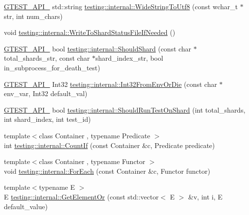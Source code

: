 \begin{DoxyCompactItemize}
\item 
\hyperlink{gtest-port_8h_aa73be6f0ba4a7456180a94904ce17790}{G\+T\+E\+S\+T\+\_\+\+A\+P\+I\+\_\+} std\+::string \hyperlink{namespacetesting_1_1internal_a05b8c86ff38243f34d8f839a0eadefb1}{testing\+::internal\+::\+Wide\+String\+To\+Utf8} (const wchar\+\_\+t $\ast$str, int num\+\_\+chars)
\item 
void \hyperlink{namespacetesting_1_1internal_a19b35b39782d41e6ef76e1910a3a502e}{testing\+::internal\+::\+Write\+To\+Shard\+Status\+File\+If\+Needed} ()
\item 
\hyperlink{gtest-port_8h_aa73be6f0ba4a7456180a94904ce17790}{G\+T\+E\+S\+T\+\_\+\+A\+P\+I\+\_\+} bool \hyperlink{namespacetesting_1_1internal_a0fe41657b1d1ab7ec4e37ec07403ee6c}{testing\+::internal\+::\+Should\+Shard} (const char $\ast$total\+\_\+shards\+\_\+str, const char $\ast$shard\+\_\+index\+\_\+str, bool in\+\_\+subprocess\+\_\+for\+\_\+death\+\_\+test)
\item 
\hyperlink{gtest-port_8h_aa73be6f0ba4a7456180a94904ce17790}{G\+T\+E\+S\+T\+\_\+\+A\+P\+I\+\_\+} Int32 \hyperlink{namespacetesting_1_1internal_aaa576613655c2f380278c255c3ec5fef}{testing\+::internal\+::\+Int32\+From\+Env\+Or\+Die} (const char $\ast$env\+\_\+var, Int32 default\+\_\+val)
\item 
\hyperlink{gtest-port_8h_aa73be6f0ba4a7456180a94904ce17790}{G\+T\+E\+S\+T\+\_\+\+A\+P\+I\+\_\+} bool \hyperlink{namespacetesting_1_1internal_a437bd89f5bc532778d7467600e210395}{testing\+::internal\+::\+Should\+Run\+Test\+On\+Shard} (int total\+\_\+shards, int shard\+\_\+index, int test\+\_\+id)
\item 
{\footnotesize template$<$class Container , typename Predicate $>$ }\\int \hyperlink{namespacetesting_1_1internal_a1e77a774d910346eff11a86d8df783a5}{testing\+::internal\+::\+Count\+If} (const Container \&c, Predicate predicate)
\item 
{\footnotesize template$<$class Container , typename Functor $>$ }\\void \hyperlink{namespacetesting_1_1internal_a52f5504ed65d116201ccb8f99a44fd7e}{testing\+::internal\+::\+For\+Each} (const Container \&c, Functor functor)
\item 
{\footnotesize template$<$typename E $>$ }\\E \hyperlink{namespacetesting_1_1internal_a71fdd20a0686bea3dc0cdcd95e0bca1c}{testing\+::internal\+::\+Get\+Element\+Or} (const std\+::vector$<$ E $>$ \&v, int i, E default\+\_\+value)
\item 

\end{DoxyCompactItemize}
